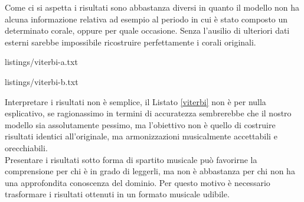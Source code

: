 Come ci si aspetta i risultati sono abbastanza diversi in quanto il modello non ha alcuna informazione relativa ad esempio al periodo in cui è stato composto un determinato corale, oppure per quale occasione. Senza l'ausilio di ulteriori dati esterni sarebbe impossibile ricostruire perfettamente i corali originali.
\begin{center}
	\begin{minipage}[h]{.45\textwidth}
		
		{listings/viterbi-a.txt}
	\end{minipage}
	\hspace{.5cm}
	\begin{minipage}[h]{.45\textwidth}
		
		{listings/viterbi-b.txt}
	\end{minipage}
	\label{viterbi}
\end{center}
Interpretare i risultati non è semplice, il Listato \ref{viterbi} non è per nulla esplicativo, se ragionassimo in termini di accuratezza sembrerebbe che il nostro modello sia assolutamente pessimo, ma l'obiettivo non è quello di costruire risultati identici all'originale, ma armonizzazioni musicalmente accettabili e orecchiabili. \\
Presentare i risultati sotto forma di spartito musicale può favorirne la comprensione per chi è in grado di leggerli, ma non è abbastanza per chi non ha una approfondita conoscenza del dominio. Per questo motivo è necessario trasformare i risultati ottenuti in un formato musicale udibile.
